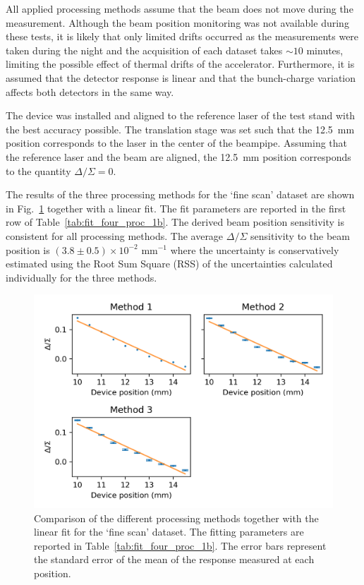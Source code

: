 All applied processing methods assume that the beam does not move during the measurement. Although the beam position monitoring was not available during these tests, it is likely that only limited drifts occurred as the measurements were taken during the night and the acquisition of each dataset takes $\sim10$ minutes, limiting the possible effect of thermal drifts of the accelerator. Furthermore, it is assumed that the detector response is linear and that the bunch-charge variation affects both detectors in the same way. 

The device was installed and aligned to the reference laser of the test stand with the best accuracy possible. The translation stage was set such that the 12.5~mm position corresponds to the laser in the center of the beampipe. Assuming that the reference laser and the beam are aligned, the 12.5~mm position corresponds to the quantity $\Delta/\Sigma=0$.

The results of the three processing methods for the `fine scan' dataset are shown in Fig.~\ref{fig:four_proc_1b} together with a linear fit. The fit parameters are reported in the first row of Table~\ref{tab:fit_four_proc_1b}. The derived beam position sensitivity is consistent for all processing methods. The average $\Delta/\Sigma$ sensitivity to the beam position is $(3.8\pm0.5)\times10^{-2}$ mm$^{-1}$ where the uncertainty is conservatively estimated using the Root Sum Square (RSS) of the uncertainties calculated individually for the three methods.

\begin{figure}[!t]
\centering
\includegraphics[scale=1, keepaspectratio]{pictures/fine_4_proc}
\caption{Comparison of the different processing methods together with the linear fit for the `fine scan' dataset. The fitting parameters are reported in Table~\ref{tab:fit_four_proc_1b}. The error bars represent the standard error of the mean of the response measured at each position.}
\label{fig:four_proc_1b}
\end{figure}


